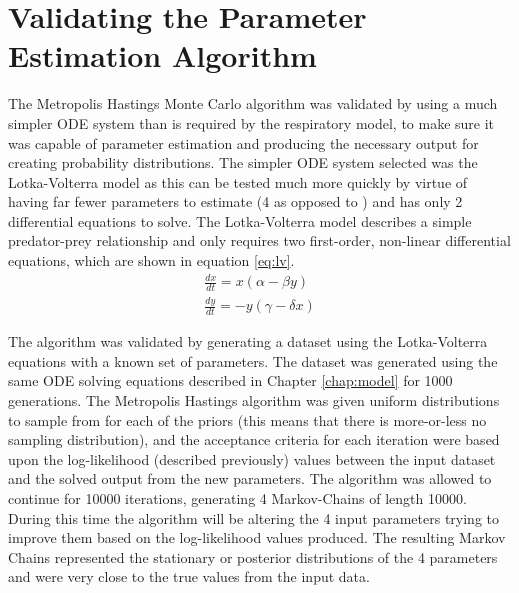 \section{Validating the Parameter Estimation Algorithm}

The Metropolis Hastings Monte Carlo algorithm was validated by using a much simpler ODE system than is required by the respiratory model, to make sure it was capable of parameter estimation and producing the necessary output for creating probability distributions. The simpler ODE system selected was the Lotka-Volterra model as this can be tested much more quickly by virtue of having far fewer parameters to estimate (4 as opposed to ) and has only 2 differential equations to solve. The Lotka-Volterra model describes a simple predator-prey relationship\cite{Lotka1925,Volterra1931} and only requires two first-order, non-linear differential equations, which are shown in equation \ref{eq:lv}.
\begin{eqnarray}
\frac{dx}{dt} = x (\alpha - \beta y)\nonumber \\
\frac{dy}{dt} = -y (\gamma - \delta x)
\label{eq:lv}
\end{eqnarray}

The algorithm was validated by generating a dataset using the Lotka-Volterra equations with a known set of parameters. The dataset was generated using the same ODE solving equations described in Chapter \ref{chap:model} for 1000 generations. The Metropolis Hastings algorithm was given uniform distributions to sample from for each of the priors (this means that there is more-or-less no sampling distribution), and the acceptance criteria for each iteration were based upon the log-likelihood (described previously) values between the input dataset and the solved output from the new parameters. The algorithm was allowed to continue for 10000 iterations, generating 4 Markov-Chains of length 10000. During this time the algorithm will be altering the 4 input parameters trying to improve them based on the log-likelihood values produced. The resulting Markov Chains represented the stationary or posterior distributions of the 4 parameters and were very close to the true values from the input data.

